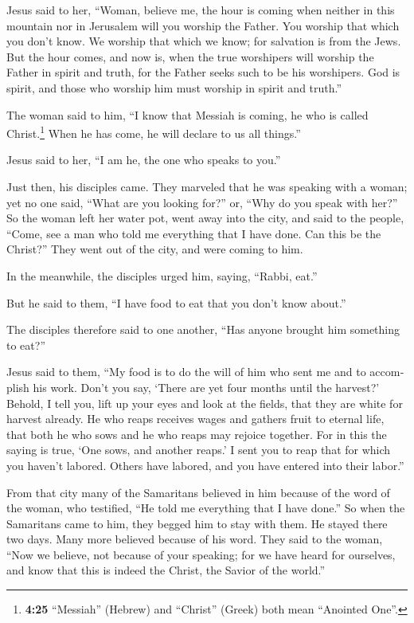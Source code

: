 \begin{paracol}{2}
\begin{otherlanguage}{english}
 Jesus said to her, ``Woman, believe me, the hour is
coming when neither in this mountain nor in Jerusalem will you worship
the Father.  You worship that which you don't know. We
worship that which we know; for salvation is from the Jews.
 But the hour comes, and now is, when the true worshipers
will worship the Father in spirit and truth, for the Father seeks such
to be his worshipers.  God is spirit, and those who
worship him must worship in spirit and truth.''

 The woman said to him, ``I know that Messiah is coming,
he who is called Christ.\footnote{\textbf{4:25} ``Messiah'' (Hebrew) and
  ``Christ'' (Greek) both mean ``Anointed One''.} When he has come, he
will declare to us all things.''

 Jesus said to her, ``I am he, the one who speaks to
you.''

 Just then, his disciples came. They marveled that he was
speaking with a woman; yet no one said, ``What are you looking for?''
or, ``Why do you speak with her?''  So the woman left her
water pot, went away into the city, and said to the people,
 ``Come, see a man who told me everything that I have
done. Can this be the Christ?''  They went out of the
city, and were coming to him.

 In the meanwhile, the disciples urged him, saying,
``Rabbi, eat.''

 But he said to them, ``I have food to eat that you don't
know about.''

 The disciples therefore said to one another, ``Has
anyone brought him something to eat?''

 Jesus said to them, ``My food is to do the will of him
who sent me and to accomplish his work.  Don't you say,
`There are yet four months until the harvest?' Behold, I tell you, lift
up your eyes and look at the fields, that they are white for harvest
already.  He who reaps receives wages and gathers fruit
to eternal life, that both he who sows and he who reaps may rejoice
together.  For in this the saying is true, `One sows, and
another reaps.'  I sent you to reap that for which you
haven't labored. Others have labored, and you have entered into their
labor.''

 From that city many of the Samaritans believed in him
because of the word of the woman, who testified, ``He told me everything
that I have done.''  So when the Samaritans came to him,
they begged him to stay with them. He stayed there two days.
 Many more believed because of his word. 
They said to the woman, ``Now we believe, not because of your speaking;
for we have heard for ourselves, and know that this is indeed the
Christ, the Savior of the world.''


\end{otherlanguage}
\end{paracol}
